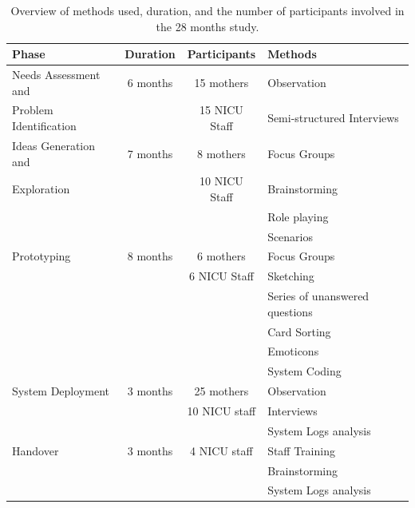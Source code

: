 \begin{table}[thb]
    \centering
    \begin{tabular}{|p{4.6cm}|c|c|p{4.5cm}|}
        \hline
        \textbf{Phase}  & \textbf{Duration} & \textbf{Participants} & \textbf{Methods}  \\ \hline
        Needs Assessment and    &     6 months          & 15 mothers   & Observation\\
       Problem Identification &     & 15 NICU Staff & Semi-structured Interviews \\ \hline
        Ideas Generation  and & 7 months  & 8 mothers         &    Focus Groups     \\
        Exploration &    & 10 NICU Staff & Brainstorming \\
         &     &   & Role playing \\
            &     &   & Scenarios \\\hline
            Prototyping &  8 months & 6 mothers & Focus Groups \\
            &  & 6 NICU Staff & Sketching \\
            & & & Series of unanswered questions \\
               & & & Card Sorting \\
                  & & & Emoticons \\
                   & & & System Coding \\
                  \hline
                    System Deployment & 3 months &25 mothers & Observation \\
                       &  & 10 NICU staff& Interviews \\
                          & & & System Logs analysis \\
                          \hline
                            Handover & 3 months & 4 NICU staff& Staff Training \\
                               & & & Brainstorming \\
                                & & & System Logs analysis \\
                            \hline
    \end{tabular}
    \caption{Overview of methods used, duration, and the number of participants involved in the 28 months study.}
    \label{Table: 28 months study}
\end{table}

